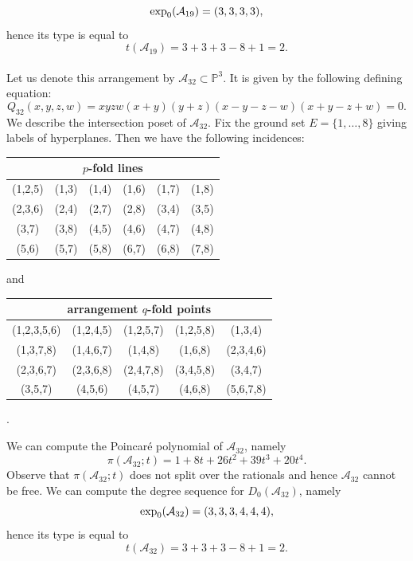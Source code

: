 \documentclass[11pt]{article}
\theoremstyle{plain}
\theoremstyle{definition}
\begin{document}
$${\rm exp}_{0}(\mathcal{A}_{19}) = (3,3,3,3),$$
hence its type is equal to
$$t(\mathcal{A}_{19})=3+3+3-8+1 = 2.$$
\\
\noindent
{}
\vskip 5pt
\noindent
Let us denote this arrangement by $\mathcal{A}_{32} \subset \mathbb{P}^{3}$. It is given by the following defining equation:
$$Q_{32}(x,y,z,w) = xyzw(x+y)(y+z)(x-y-z-w)(x+y-z+w)=0.$$
We describe the intersection poset of $\mathcal{A}_{32}$. Fix the ground set $E= \{1, \ldots , 8\}$ giving labels of hyperplanes. Then we have the following incidences:
\begin{center}
\begin{tabular}{ c c c c c c }
\multicolumn{6}{c}{$p$-fold lines} \\\hline \hline
(1,2,5) & (1,3) & (1,4) & (1,6) & (1,7) & (1,8) \\
(2,3,6) & (2,4) & (2,7) & (2,8) & (3,4) & (3,5) \\
(3,7) & (3,8) & (4,5) & (4,6) & (4,7) & (4,8) \\
(5,6) & (5,7) & (5,8) & (6,7) & (6,8) & (7,8)

\end{tabular}
\end{center}
and 
\begin{center}
\begin{tabular}{ c c c c c }
\multicolumn{5}{c}{arrangement $q$-fold points} \\ \hline \hline 
(1,2,3,5,6) &  (1,2,4,5) & (1,2,5,7) &  (1,2,5,8) &  (1,3,4) \\
(1,3,7,8) & (1,4,6,7) & (1,4,8) & (1,6,8) & (2,3,4,6) \\  
(2,3,6,7) & (2,3,6,8) & (2,4,7,8) & (3,4,5,8) & (3,4,7) \\
(3,5,7) & (4,5,6) & (4,5,7) & (4,6,8) & (5,6,7,8)

\end{tabular}.
\end{center}
We can compute the Poincar\'e polynomial of $\mathcal{A}_{32}$, namely
$$\pi(\mathcal{A}_{32};t) = 1 + 8t + 26t^{2} + 39t^{3} + 20t^{4}.$$
Observe that $\pi(\mathcal{A}_{32};t)$ does not split over the rationals and hence $\mathcal{A}_{32}$ cannot be free. We can compute the degree sequence for $D_{0}(\mathcal{A}_{32})$, namely
$${\rm exp}_{0}(\mathcal{A}_{32}) = (3,3,3,4,4,4),$$
hence its type is equal to
$$t(\mathcal{A}_{32})=3+3+3-8+1 = 2.$$ 
\\
\end{document}
